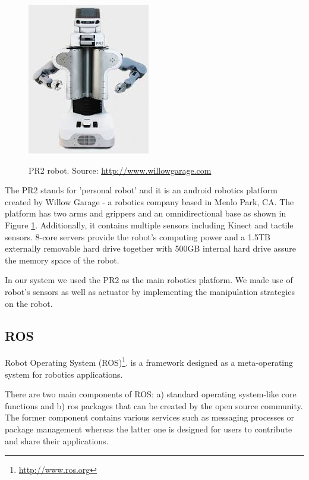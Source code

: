 \begin{figure}
\centering

{\includegraphics[width=0.5\columnwidth]{figures/pr2.jpeg}}

\caption{PR2 robot. Source: \url{http://www.willowgarage.com}}
\label{fig:pr2}
\end{figure}

The PR2 stands for 'personal robot' and it is an android robotics platform created by Willow Garage - a robotics company based in Menlo Park, CA. The platform has two arms and grippers and an omnidirectional base as shown in Figure \ref{fig:pr2}. Additionally, it contains multiple sensors including Kinect and tactile sensors. 8-core servers provide the robot's computing power and a 1.5TB externally removable hard drive together with 500GB internal hard drive assure the memory space of the robot.  

In our system we used the PR2 as the main robotics platform. We made use of robot's sensors as well as actuator by implementing the manipulation strategies on the robot.

\subsection{ROS}
Robot Operating System (ROS)\footnote{\url{http://www.ros.org}}. is a framework designed as a meta-operating system for robotics applications. 

There are two main components of ROS: a) standard operating system-like core functions and b) ros packages that can be created by the open source community. The former component contains various services such as messaging processes or package management whereas the latter one is designed for users to contribute and share their applications. 



